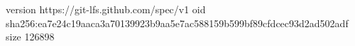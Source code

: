 version https://git-lfs.github.com/spec/v1
oid sha256:ea7e24c19aaca3a70139923b9aa5e7ac588159b599bf89cfdcec93d2ad502adf
size 126898

